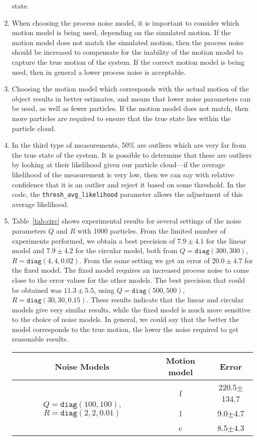 \documentclass[a4paper,12pt]{article}
\begin{document}
\begin{enumerate}
  state.
\item When choosing the process noise model, it is important to consider which
  motion model is being used, depending on the simulated motion. If the motion
  model does not match the simulated motion, then the process noise should be
  increased to compensate for the inability of the motion model to capture the
  true motion of the system. If the correct motion model is being used, then in
  general a lower process noise is acceptable.
\item Choosing the motion model which corresponds with the actual motion of the
  object results in better estimates, and means that lower noise parameters can
  be used, as well as fewer particles. If the motion model does not match, then
  more particles are required to ensure that the true state lies within the
  particle cloud.
\item In the third type of measurements, 50\% are outliers which are very far
  from the true state of the system. It is possible to determine that these are
  outliers by looking at their likelihood given our particle cloud---if the
  average likelihood of the measurement is very low, then we can say with
  relative confidence that it is an outlier and reject it based on some
  threshold. In the code, the \texttt{thresh\_avg\_likelihood} parameter allows
  the adjustment of this average likelihood.
\item Table~\ref{tab:circ} shows experimental results for several settings of
  the noise parameters $Q$ and $R$ with 1000 particles. From the limited number
  of experiments performed, we obtain a best precision of $7.9\pm 4.1$ for the
  linear model and $7.9\pm 4.2$ for the circular model, both from
  $Q=\texttt{diag}(300,300)$, $R=\texttt{diag}(4, 4, 0.02)$. From the same
  setting we get an error of $20.0\pm 4.7$ for the fixed model. The fixed model
  requires an increased process noise to come close to the error values for the
  other models. The best precision that could be obtained was $11.3\pm 5.5$,
  using $Q=\texttt{diag}(500,500)$, $R=\texttt{diag}(30,30,0.15)$. These results
  indicate that the linear and circular models give very similar results, while
  the fixed model is much more sensitive to the choice of noise models. In
  general, we could say that the better the model corresponds to the true
  motion, the lower the noise required to get reasonable results.
  \begin{table}
    \centering
    \begin{tabular}{ccc}
      Noise Models                    & Motion model & Error \\\hline
      \multirow{3}{*}{$Q=\texttt{diag}(100,100)$, $R=\texttt{diag}(2, 2, 0.01)$}& f    & 220.5$\pm$134.7 \\
      & l    & 9.0$\pm$4.7     \\
      & c    & 8.5$\pm$4.3     \\\hline


\end{tabular}
\end{table}
\end{enumerate}
\end{document}
